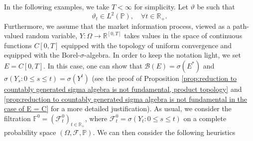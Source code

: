 \documentclass[11pt,a4paper,twoside,openany]{report}
\numberwithin{equation}{section}
\theoremstyle{plain} %
\theoremstyle{definition} %
\theoremstyle{remark} %
\begin{document}
In the following examples, we take \(T<\infty\) for simplicity. Let \(\vartheta\) be such that 
\begin{equation*}
      \vartheta_t\in L^2(\mathbb{P}),\quad\forall t\in\mathbb{R}_+.
\end{equation*}
Furthermore, we assume that the market information process, viewed as a path-valued random variable, \(Y:\Omega\to \mathbb{R}^{[0,T]}\) takes values in the space of continuous functions \(C[0,T]\) equipped with the topology of uniform convergence  and equipped with the Borel-\(\sigma\)-algebra. In order to keep the notation light, we set \(E=C[0,T]\). In this case, one can show that \(\mathcal{B}(E)=\sigma(E^*)\) and \(\sigma(Y_s:0\leq s \leq t)=\sigma(Y^t)\) (see the proof of Proposition \ref{prop:reduction to countably generated sigma algebra is not fundamental, product topology} and \ref{prop:reduction to countably generated sigma algebra is not fundamental in the case of E = C} for a more detailed justification). As usual, we consider the filtration \(\mathbb{F}^0=(\mathcal{F}^0_t)_{t\in\mathbb{R}_+}\), where \(\mathcal{F}^0_t=\sigma(Y_t:0\leq s\leq t )\) on a complete probability space \((\Omega,\mathcal{F},\mathbb{P})\). We can then consider the following heuristics
\end{document}
